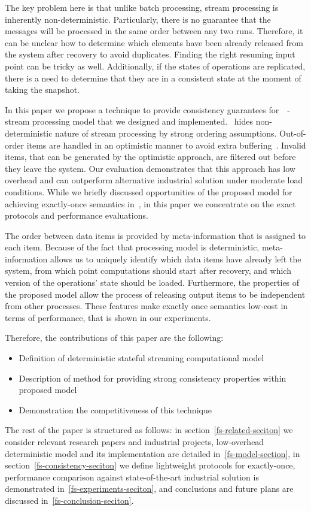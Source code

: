 The key problem here is that unlike batch processing, stream processing is inherently non-deterministic. Particularly, there is no guarantee that the messages will be processed in the same order between any two runs. Therefore, it can be unclear how to determine which elements have been already released from the system after recovery to avoid duplicates. Finding the right resuming input point can be tricky as well. Additionally, if the states of operations are replicated, there is a need to determine that they are in a consistent state at the moment of taking the snapshot. 

In this paper we propose a technique to provide consistency guarantees for~\FlameStream\ - stream processing model that we designed and implemented. \FlameStream\ hides non-deterministic nature of stream processing by strong ordering assumptions. Out-of-order items are handled in an optimistic manner to avoid extra buffering~\cite{we2018seim}. Invalid items, that can be generated by the optimistic approach, are filtered out before they leave the system. Our evaluation demonstrates that this approach has low overhead and can outperform alternative industrial solution under moderate load conditions. While we briefly discussed opportunities of the proposed model for achieving exactly-once semantics in~\cite{we2018beyondmr}, in this paper we concentrate on the exact protocols and performance evaluations.

The order between data items is provided by meta-information that is assigned to each item. Because of the fact that processing model is deterministic, meta-information allows us to uniquely identify which data items have already left the system, from which point computations should start after recovery, and which version of the operations' state should be loaded. Furthermore, the properties of the proposed model allow the process of releasing output items to be independent from other processes. These features make exactly once semantics low-cost in terms of performance, that is shown in our experiments. 

Therefore, the contributions of this paper are the following: 
\begin{itemize}
    \item Definition of deterministic stateful streaming computational model 
    \item Description of method for providing strong consistency properties within proposed model 
    \item Demonstration the competitiveness of this technique
\end{itemize}

The rest of the paper is structured as follows: in section~\ref{fs-related-seciton} we consider relevant research papers and industrial projects, low-overhead deterministic model and its implementation are detailed in~\ref{fs-model-section}, in section~\ref{fs-consistency-seciton} we define lightweight protocols for exactly-once, performance comparison against state-of-the-art industrial solution is demonstrated in~\ref{fs-experiments-seciton}, and conclusions and future plans are discussed in~\ref{fs-conclusion-seciton}.

